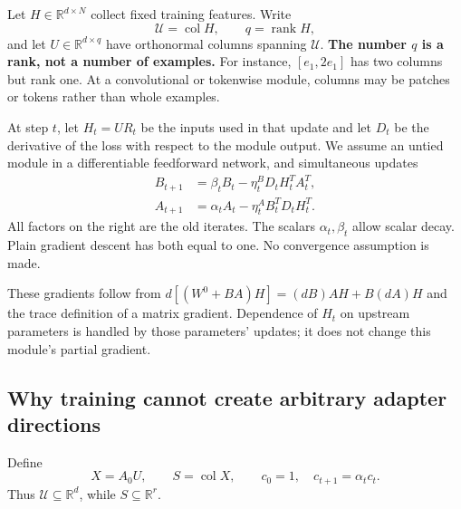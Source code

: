\documentclass[12pt,a4paper]{article}
\theoremstyle{readable}
\theoremstyle{definition}\newtheorem{example}[theorem]{Example}
\newcommand{\R}{\mathbb R}\newcommand{\rank}{\operatorname{rank}}
\newcommand{\col}{\operatorname{col}}\newcommand{\row}{\operatorname{row}}
\begin{document}
Let \(H\in\R^{d\times N}\) collect fixed training features. Write
\[
\mathcal U=\col H,\qquad q=\rank H,
\]
and let \(U\in\R^{d\times q}\) have orthonormal columns spanning \(\mathcal U\).
\textbf{The number \(q\) is a rank, not a number of examples.} For instance, \([e_1,2e_1]\) has two columns but rank one. At a convolutional or tokenwise module, columns may be patches or tokens rather than whole examples.

At step \(t\), let \(H_t=UR_t\) be the inputs used in that update and let \(D_t\) be the derivative of the loss with respect to the module output. We assume an untied module in a differentiable feedforward network, and simultaneous updates
\begin{align}
B_{t+1}&=\beta_t B_t-\eta_t^B D_tH_t^TA_t^T,\label{eq:Bg}\\
A_{t+1}&=\alpha_t A_t-\eta_t^A B_t^TD_tH_t^T.\label{eq:Ag}
\end{align}
All factors on the right are the old iterates. The scalars \(\alpha_t,\beta_t\) allow scalar decay. Plain gradient descent has both equal to one. No convergence assumption is made.

These gradients follow from
\(d[(W^0+BA)H]=(dB)AH+B(dA)H\) and the trace definition of a matrix gradient. Dependence of \(H_t\) on upstream parameters is handled by those parameters' updates; it does not change this module's partial gradient.

\subsection{Why training cannot create arbitrary adapter directions}
Define
\[
X=A_0U,\qquad S=\col X,\qquad c_0=1,\quad c_{t+1}=\alpha_tc_t.
\]
Thus \(\mathcal U\subseteq\R^d\), while \(S\subseteq\R^r\).
\end{document}
